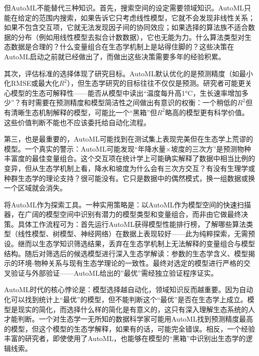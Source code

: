 \documentclass[
  twoside,12pt,fontset=none]{ctexbook}
\begin{document}
但AutoML不能替代三种知识。首先，搜索空间的设定需要领域知识。AutoML只能在给定的范围内搜索，如果告诉它只考虑线性模型，它就不会发现非线性关系；如果不包含交互项，它就无法发现因子间的协同效应；如果选择的算法族不适合数据的分布（例如用线性模型去拟合计数数据），它也无能为力。什么算法类型对生态数据是合理的？什么变量组合在生态学机制上是站得住脚的？这些决策在AutoML启动之前就已经做出了，而做出这些决策需要多年的经验积累。

其次，评估标准的选择体现了研究目标。AutoML默认优化的是预测精度（如最小化RMSE或最大化\(R^2\)），但生态学研究的目标往往不仅仅是预测。研究者可能更关心模型的生态可解释性------能否从模型中读出``温度每升高1°C，生长速率增加多少''？有时需要在预测精度和模型简洁性之间做出有意识的权衡：一个稍低的\(R^2\)但有清晰生态机制解释的模型，可能比一个``黑箱''但\(R^2\)略高的模型更有科学价值。这些价值判断不能也不应该委托给自动化流程。

第三，也是最重要的，AutoML可能找到在测试集上表现完美但在生态学上荒谬的模型。一个真实的警示：AutoML可能发现``年降水量\(\times\)坡度的三次方''是预测物种丰富度的最佳变量组合。这个交互项在统计学上可能确实解释了数据中相当比例的变异，但从生态学机制上看，降水和坡度为什么会有三次方交互？有没有生理学或种群生态学的理论支持？很可能没有。它只是数据中的偶然模式，换一组数据或换一个区域就会消失。

将AutoML作为探索工具。一种实用策略是：以AutoML作为模型空间的快速扫描器，在广阔的模型空间中识别有潜力的模型类型和变量组合，而非由它做最终决策。具体工作流程可为：首先运行AutoML获得模型性能排行榜，了解哪些算法类型（线性模型、树模型、神经网络）在数据上表现较好------此为纯粹探索，无需预设。继而以生态学知识筛选结果，丢弃在生态学机制上无法解释的变量组合与模型结构。随后对筛选后的候选模型进行深入生态学解读：参数的生态学含义、模型揭示的环境-物种关系与现有生态学理论的一致性。最终对选定的模型进行严格的交叉验证与外部验证------AutoML给出的''最优''需经独立验证程序证实。

AutoML时代的核心悖论是：模型选择越自动化，领域知识反而越重要。因为自动化可以找到统计上``最优''的模型，但不能判断这个``最优''是否在生态学上成立。模型是现实的简化，而选择什么样的简化是有意义的，这只有深入理解生态系统的人才能判断。一个对生态学一无所知的数据科学家可能用AutoML找到预测精度最高的模型，但这个模型的生态学解释，如果有的话，可能完全错误。相反，一个经验丰富的研究者，即使使用了AutoML，也能够在模型的``黑箱''中识别出生态学的逻辑线索。
\end{document}
